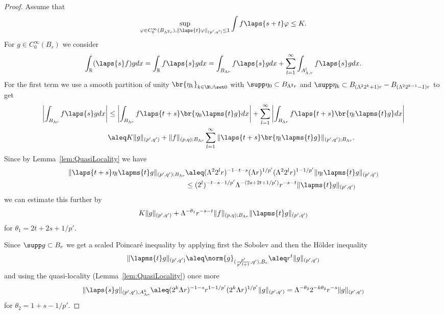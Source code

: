 \begin{proof}
Assume that 
\[
 \sup_{\varphi \in C_0^\infty(B_{\Lambda^{2} r}), \|\laps{t}\varphi\|_{(p',q')} \leq 1}
  \int f \laps{s+t} \varphi  \leq K.
\]
For $g \in C_0^{\infty}(B_r)$ we consider
\begin{align*}
 \int_{\mathbb R} (\laps{s} f) g dx= \int_{\mathbb R} f\laps{s} g dx
 = \int_{B_{\Lambda r}} f\laps{s} g dx+ \sum_{l=1}^\infty \int_{A^l_{\Lambda, r}} f\laps{s} g dx.
\end{align*}
For the first term we use a smooth partition of unity $\br{\eta_k}_{{k\in\N\cup\set0}}$
with $\supp \eta_0 \subset B_{\Lambda^2 r}$ and 
$\supp \eta_k \subset B_{(\Lambda^{2} 2^{k}+1)r} -B_{(\Lambda^{2} 2^{k-1}-1)r}$
to get
\begin{align*}
   \left|\int_{B_{\Lambda r}} f\laps{s} g dx\right| 
   &\leq \left|\int_{B_{\Lambda r}} f\laps{t+s} \br{\eta_0
  \lapms{t} g} dx\right|+ \sum_{l=1}^\infty
  \left|\int_{B_{\Lambda r}} f\laps{t+s} \br{\eta_l
  \lapms{t} g} dx\right| \\
  &\aleq K \| g\|_{(p',q')} + \|f\|_{(p,q); B_{\Lambda r}} \sum_{l=1}^\infty 
   \|\laps{t+s} \br{\eta_l
  \lapms{t} g}\|_{(p',q');B_{\Lambda r}}.
\end{align*}
Since by Lemma~\ref{lem:QuasiLocality} we have
\begin{align*}
 \|\laps{t+s} \eta_l \lapms{t} g\|_{(p',q');B_{\Lambda r}} 
 &\aleq (\Lambda^2 2^l r)^{-1-t-s} (\Lambda r)^{1/p'} (\Lambda^2 2^l r)^{1-1/p'}
 \|\eta_l\lapms{t} g\|_{(p',q')}  \\
 &\leq  (2^l )^{-t-s-1/p'} \Lambda^{-(2s+2t+1/p')} r^{-s-t}
 \|\lapms{t}g\|_{(p',q')}  
\end{align*}
we can estimate this further by
\[  K \|g\|_{(p',q')} + \Lambda^{-\theta_{1}}r^{-s-t}\|f\|_{(p,q); B_{\Lambda r}} \|\lapms{t} g\|_{(p',q')} \]
for $\theta_1 = 2t+2s+1/p'$.

Since $\supp g \subset B_r$ we get a scaled Poincar\'e inequality by applying first the Sobolev and then the H\"older inequality
\begin{equation*}
 \|\lapms{t} g\|_{(p',q')} \aleq \norm{g}_{(\frac{p'}{p't+1},q'),B_r}
 \aleq  r^{t} \|g\|_{(p',q')}  
\end{equation*}
and using the quasi-locality (Lemma~\ref{lem:QuasiLocality}) once more
\begin{equation*}
 \|\laps{s} g\|_{(p',q'),A^k_{\Lambda r}}
  \aleq (2^{k}\Lambda r)^{-1-s}r^{1-1/p'}(2^{k}\Lambda r)^{1/p'}\|g\|_{(p',q')}
  = \Lambda^{-\theta_2} 2^{-k \theta_2} r^{-s} \|g\|_{(p',q')}
\end{equation*}
for $\theta_2 = 1+s-1/p'$.


\end{proof}
